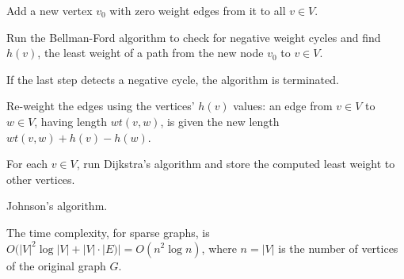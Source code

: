 \begin{algorithm}[!htpb]
\dontprintsemicolon  %
\BlankLine
Add a new vertex $v_0$ with zero weight edges from it to all $v \in V$.\;

Run the Bellman-Ford algorithm to check for negative weight cycles
and find $h(v)$, the least weight of a path from the new node $v_0$ to
$v \in V$.

If the last step detects a negative cycle, the algorithm is terminated.\;

Re-weight the edges using the vertices' $h(v)$ values: an edge from
$v \in V$ to $w \in V$, having length $wt(v,w)$, is given the new length
$wt(v,w) + h(v) - h(w)$.\;

For each $v \in V$, run Dijkstra's algorithm and store the computed
least weight to other vertices.
\caption{Johnson's algorithm.}
\label{alg:graph_algorithms:johnson}
\end{algorithm}

The time complexity, for sparse graphs, is
$O(|V|^2\log |V| + |V| \cdot |E)|=O(n^2\log n)$, where $n = |V|$ is
the number of vertices of the original graph $G$.
